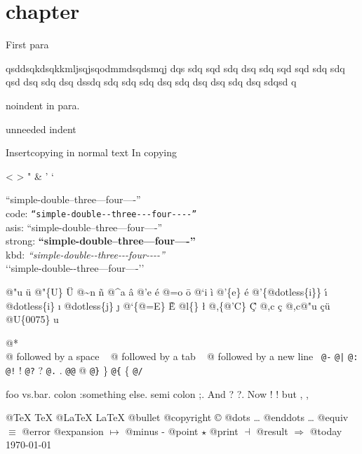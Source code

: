 \documentclass{book}
\begin{document}
\chapter{chapter}
\label{anchor:chapter}%

First para

\noindent{}qsddsqkdsqkkmljsqjsqodmmdsqdsmqj dqs sdq sqd sdq dsq sdq sqd sqd sdq sdq 
qsd dsq sdq dsq dssdq sdq sdq sdq dsq sdq dsq dsq sdq dsq sdqsd q

\noindent{}noindent in para.

unneeded indent

Insertcopying in normal text
In copying

<
>
"
\&
'
`

``simple-double--three---four----''\leavevmode{}\\
code: \texttt{``simple-double{-}{-}three{-}{-}{-}four{-}{-}{-}-''} \leavevmode{}\\
asis: ``simple-double--three---four----'' \leavevmode{}\\
strong: \textbf{``simple-double--three---four----''} \leavevmode{}\\
kbd: {\ttfamily\textsl{``simple-double{-}{-}three{-}{-}{-}four{-}{-}{-}-''}} \leavevmode{}\\

`\hbox{}`simple-double-\hbox{}-three---four----'\hbox{}'\leavevmode{}\\

%
%
%
%

@"u \"{u} 
@"\{U\} \"{U} 
@\~{}n \~{n}
@\^{}a \^{a}
@'e \'{e}
@=o \={o}
@`i \`{i}
@'\{e\} \'{e}
@'\{@dotless\{i\}\} \'{\i{}} 
@dotless\{i\} \i{}
@dotless\{j\} \j{}
@`\{@=E\} \`{\={E}} 
@l\{\} \l{}
@,\{@'C\} \c{\'{C}}
@,c \c{c}
@,c@"u \c{c}\"{u} \leavevmode{}\\

@U\{0075\} u

@* \leavevmode{}\\
@ followed by a space
\ {}
@ followed by a tab
\ {}
@ followed by a new line
\ {}\texttt{@-} \-{}
\texttt{@|} 
\texttt{@:} \@
\texttt{@!} \@!
\texttt{@?} \@?
\texttt{@.} \@.
\texttt{@@} @
\texttt{@\}} \}
\texttt{@\{} \{
\texttt{@/} 

foo vs.\@ bar. 
colon :\@And something else.
semi colon ;\@.
And ? ?\@.
Now ! !\@@
but , ,\@

@TeX \TeX{}
@LaTeX \LaTeX{}
@bullet \textbullet{}
@copyright \copyright{}
@dots \dots{}\@
@enddots \dots{}
@equiv $\equiv{}$
@error 
@expansion $\mapsto{}$
@minus -
@point $\star{}$
@print $\dashv{}$
@result $\Rightarrow{}$
@today \today{}
\end{document}
